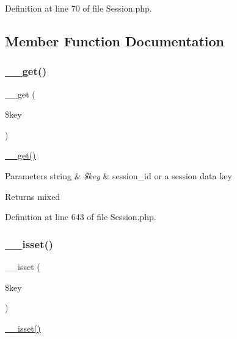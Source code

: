 Definition at line 70 of file Session.\+php.



\subsection{Member Function Documentation}
\mbox{\label{class_c_i___session_a4537dad3b44254124991341cc91b28fb}} 
\subsubsection{\texorpdfstring{\_\_get()}{\_\_get()}}
{\footnotesize\ttfamily \+\_\+\+\_\+get (\begin{DoxyParamCaption}\item[{}]{\$key }\end{DoxyParamCaption})}

\mbox{\hyperlink{class_c_i___session_a4537dad3b44254124991341cc91b28fb}{\+\_\+\+\_\+get()}}


\begin{DoxyParams}[1]{Parameters}
string & {\em \$key} & \textquotesingle{}session\+\_\+id\textquotesingle{} or a session data key \\
\hline
\end{DoxyParams}
\begin{DoxyReturn}{Returns}
mixed 
\end{DoxyReturn}


Definition at line 643 of file Session.\+php.

\mbox{\label{class_c_i___session_ae858fed7cd2822fbceac154138b68baa}} 
\subsubsection{\texorpdfstring{\_\_isset()}{\_\_isset()}}
{\footnotesize\ttfamily \+\_\+\+\_\+isset (\begin{DoxyParamCaption}\item[{}]{\$key }\end{DoxyParamCaption})}

\mbox{\hyperlink{class_c_i___session_ae858fed7cd2822fbceac154138b68baa}{\+\_\+\+\_\+isset()}}


